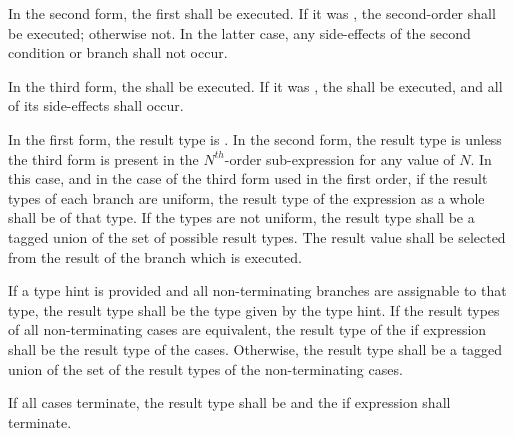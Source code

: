\specsubsubitem
In the second form, the first  shall be
executed. If it was , the second-order
 shall be executed; otherwise not. In the latter
case, any side-effects of the second condition or branch shall not occur.

\specsubsubitem
In the third form, the  shall be executed. If
it was , the  shall be executed, and all
of its side-effects shall occur.

\specsubsubitem
In the first form, the result type is . In the second form, the
result type is  unless the third form is present in the
$N^{th}$-order sub-expression for any value of $N$. In this case, and in the
case of the third form used in the first order, if the result types of each
branch are uniform, the result type of the expression as a whole shall be of
that type. If the types are not uniform, the result type shall be a tagged
union of the set of possible result types. The result value shall be selected
from the result of the branch which is executed.

\specsubsubitem
If a type hint is provided and all non-terminating branches are assignable to
that type, the result type shall be the type given by the type hint. If the
result types of all non-terminating cases are equivalent, the result type of
the if expression shall be the result type of the cases. Otherwise, the
result type shall be a tagged union of the set of the result types of the
non-terminating cases.

If all cases terminate, the result type shall be  and the if
expression shall terminate.


\begin{grammar}
 \\
	  \terminal{(}  \terminal{)}  \\

 \\
	 \\
	 \terminal{;}  \\
	 \terminal{;}  \\
	 \terminal{;}  \terminal{;}  \\

\exactly \\
	\terminal{:}  \\
\end{grammar}

